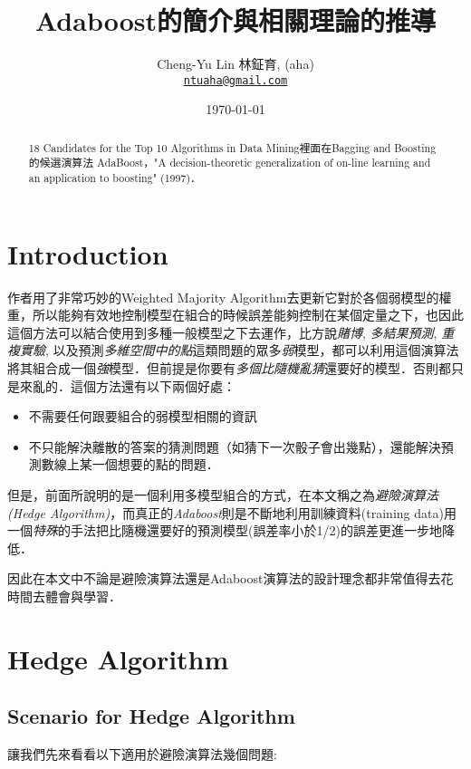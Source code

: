 \documentclass[12pt]{report}
\author{Cheng-Yu Lin 林鉦育, (aha)\\
		\href{mailto:ntuaha@gmai.com}{\texttt{ntuaha@gmail.com}}}
\title{Adaboost的簡介與相關理論的推導}
\date{\today}
\numberwithin{equation}{section}
\begin{document}
 
\begin{CJK}{UTF8}{bsmi} 
\maketitle

\tableofcontents
\thispagestyle{empty}
\setcounter{page}{0}
\newpage


\begin{abstract}
18 Candidates for the Top 10 Algorithms in Data Mining\cite{}裡面在Bagging and Boosting的候選演算法 AdaBoost，"A decision-theoretic generalization of on-line learning and an application to boosting\cite{}" (1997)．
\end{abstract}


\chapter{Introduction}
作者用了非常巧妙的Weighted Majority Algorithm\cite{}去更新它對於各個弱模型的權重，所以能夠有效地控制模型在組合的時候誤差能夠控制在某個定量之下，也因此這個方法可以結合使用到多種一般模型之下去運作，比方說\textit{賭博}, \textit{多結果預測}, \textit{重複實驗}, 以及預測\textit{多維空間中的點}這類問題的眾多\textit{弱}模型，都可以利用這個演算法將其組合成一個\textit{強}模型．但前提是你要有\textit{多個比隨機亂猜}還要好的模型．否則都只是來亂的．這個方法還有以下兩個好處：
\begin{itemize}
\item 不需要任何跟要組合的弱模型相關的資訊
\item 不只能解決離散的答案的猜測問題（如猜下一次骰子會出幾點），還能解決預測數線上某一個想要的點的問題．
\end{itemize}

但是，前面所說明的是一個利用多模型組合的方式，在本文稱之為\textit{避險演算法 (Hedge Algorithm)}，而真正的\textit{Adaboost}則是不斷地利用訓練資料(training data)用一個\textit{特殊}的手法把比隨機還要好的預測模型(誤差率小於1/2)的誤差更進一步地降低．

因此在本文中不論是避險演算法還是Adaboost演算法的設計理念都非常值得去花時間去體會與學習．



\chapter {Hedge Algorithm}


\section{Scenario for Hedge Algorithm}
讓我們先來看看以下適用於避險演算法幾個問題:


\end{CJK}
\end{document}
